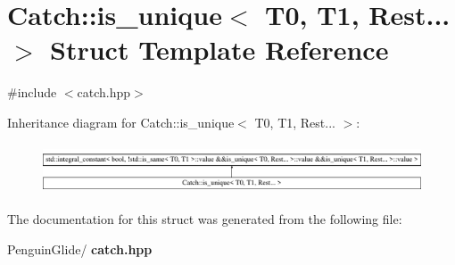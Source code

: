 \section{Catch\+::is\+\_\+unique$<$ T0, T1, Rest... $>$ Struct Template Reference}
\label{struct_catch_1_1is__unique_3_01_t0_00_01_t1_00_01_rest_8_8_8_01_4}


{\ttfamily \#include $<$catch.\+hpp$>$}

Inheritance diagram for Catch\+::is\+\_\+unique$<$ T0, T1, Rest... $>$\+:\begin{figure}[H]
\begin{center}
\leavevmode
\includegraphics[height=1.483444cm]{struct_catch_1_1is__unique_3_01_t0_00_01_t1_00_01_rest_8_8_8_01_4}
\end{center}
\end{figure}


The documentation for this struct was generated from the following file\+:\begin{DoxyCompactItemize}
\item 
Penguin\+Glide/\textbf{ catch.\+hpp}\end{DoxyCompactItemize}
